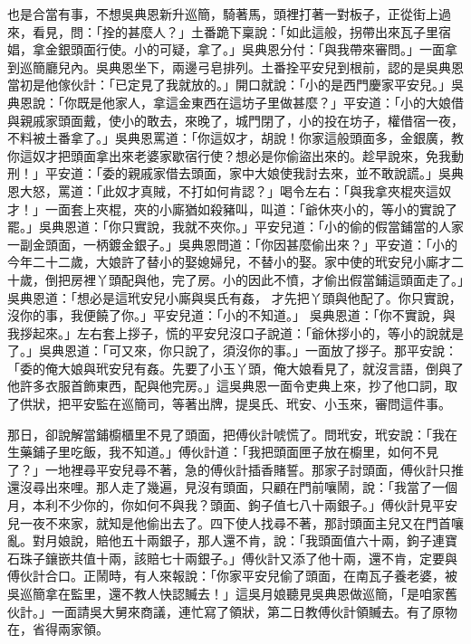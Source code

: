 \begin{showcontents}{}
也是合當有事，不想吳典恩新升巡簡，騎著馬，頭裡打著一對板子，正從街上過來，看見，問：「拴的甚麼人？」土番跪下稟說：「如此這般，拐帶出來瓦子里宿娼，拿金銀頭面行使。小的可疑，拿了。」吳典恩分付：「與我帶來審問。」一面拿到巡簡廳兒內。吳典恩坐下，兩邊弓皂排列。土番拴平安兒到根前，認的是吳典恩當初是他傢伙計：「已定見了我就放的。」開口就說：「小的是西門慶家平安兒。」吳典恩說：「你既是他家人，拿這金東西在這坊子里做甚麼？」平安道：「小的大娘借與親戚家頭面戴，使小的敢去，來晚了，城門閉了，小的投在坊子，權借宿一夜，不料被土番拿了。」吳典恩罵道：「你這奴才，胡說！你家這般頭面多，金銀廣，教你這奴才把頭面拿出來老婆家歇宿行使？想必是你偷盜出來的。趁早說來，免我動刑！」平安道：「委的親戚家借去頭面，家中大娘使我討去來，並不敢說謊。」吳典恩大怒，罵道：「此奴才真賊，不打如何肯認？」喝令左右：「與我拿夾棍夾這奴才！」一面套上夾棍，夾的小廝猶如殺豬叫，叫道：「爺休夾小的，等小的實說了罷。」吳典恩道：「你只實說，我就不夾你。」平安兒道：「小的偷的假當鋪當的人家一副金頭面，一柄鍍金銀子。」吳典恩問道：「你因甚麼偷出來？」平安道：「小的今年二十二歲，大娘許了替小的娶媳婦兒，不替小的娶。家中使的玳安兒小廝才二十歲，倒把房裡丫頭配與他，完了房。小的因此不憤，才偷出假當鋪這頭面走了。」吳典恩道：「想必是這玳安兒小廝與吳氏有姦，
才先把丫頭與他配了。你只實說，沒你的事，我便饒了你。」平安兒道：「小的不知道。」 吳典恩道：「你不實說，與我拶起來。」左右套上拶子，慌的平安兒沒口子說道：「爺休拶小的，等小的說就是了。」吳典恩道：「可又來，你只說了，須沒你的事。」一面放了拶子。那平安說：「委的俺大娘與玳安兒有姦。先要了小玉丫頭，俺大娘看見了，就沒言語，倒與了他許多衣服首飾東西，配與他完房。」這吳典恩一面令吏典上來，抄了他口詞，取了供狀，把平安監在巡簡司，等著出牌，提吳氏、玳安、小玉來，審問這件事。

那日，卻說解當鋪櫥櫃里不見了頭面，把傅伙計唬慌了。問玳安，玳安說：「我在生藥鋪子里吃飯，我不知道。」傅伙計道：「我把頭面匣子放在櫥里，如何不見了？」一地裡尋平安兒尋不著，急的傅伙計插香賭誓。那家子討頭面，傅伙計只推還沒尋出來哩。那人走了幾遍，見沒有頭面，只顧在門前嚷鬧，說：「我當了一個月，本利不少你的，你如何不與我？頭面、鉤子值七八十兩銀子。」傅伙計見平安兒一夜不來家，就知是他偷出去了。四下使人找尋不著，那討頭面主兒又在門首嚷亂。對月娘說，賠他五十兩銀子，那人還不肯，說：「我頭面值六十兩，鉤子連寶石珠子鑲嵌共值十兩，該賠七十兩銀子。」傅伙計又添了他十兩，還不肯，定要與傅伙計合口。正鬧時，有人來報說：「你家平安兒偷了頭面，在南瓦子養老婆，被吳巡簡拿在監里，還不教人快認贓去！」這吳月娘聽見吳典恩做巡簡，「是咱家舊伙計。」一面請吳大舅來商議，連忙寫了領狀，第二日教傅伙計領贓去。有了原物在，省得兩家領。


\end{showcontents}

